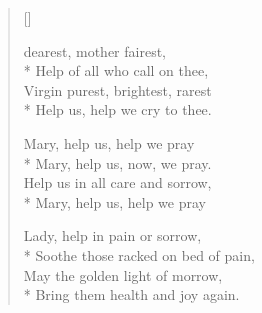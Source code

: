 \newHymn


\begin{verse}[\versewidth]

 dearest, mother fairest,\\*
Help of all who call on thee,\\
Virgin purest, brightest, rarest\\*
Help us, help we cry to thee.

Mary, help us, help we pray\\*
Mary, help us, now, we pray.\\
Help us in all care and sorrow,\\*
Mary, help us, help we pray

 Lady, help in pain or sorrow,\\*
Soothe those racked on bed of pain,\\
May the golden light of morrow,\\*
Bring them health and joy again.

\end{verse}

